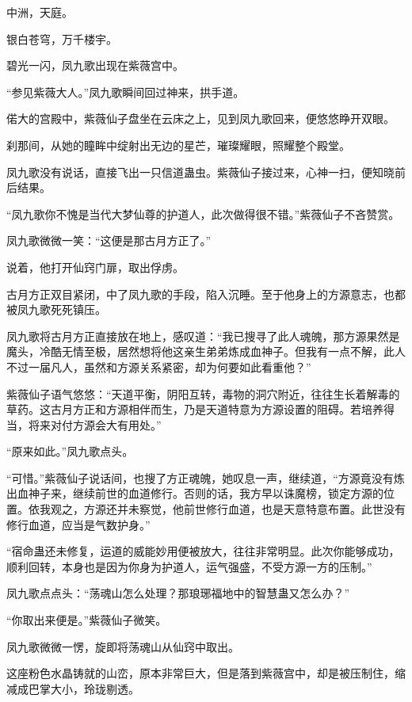 
\begin{this_body}



中洲，天庭。

银白苍穹，万千楼宇。

碧光一闪，凤九歌出现在紫薇宫中。

“参见紫薇大人。”凤九歌瞬间回过神来，拱手道。

偌大的宫殿中，紫薇仙子盘坐在云床之上，见到凤九歌回来，便悠悠睁开双眼。

刹那间，从她的瞳眸中绽射出无边的星芒，璀璨耀眼，照耀整个殿堂。

凤九歌没有说话，直接飞出一只信道蛊虫。紫薇仙子接过来，心神一扫，便知晓前后结果。

“凤九歌你不愧是当代大梦仙尊的护道人，此次做得很不错。”紫薇仙子不吝赞赏。

凤九歌微微一笑：“这便是那古月方正了。”

说着，他打开仙窍门扉，取出俘虏。

古月方正双目紧闭，中了凤九歌的手段，陷入沉睡。至于他身上的方源意志，也都被凤九歌死死镇压。

凤九歌将古月方正直接放在地上，感叹道：“我已搜寻了此人魂魄，那方源果然是魔头，冷酷无情至极，居然想将他这亲生弟弟炼成血神子。但我有一点不解，此人不过一届凡人，虽然和方源关系紧密，却为何要如此看重他？”

紫薇仙子语气悠悠：“天道平衡，阴阳互转，毒物的洞穴附近，往往生长着解毒的草药。这古月方正和方源相伴而生，乃是天道特意为方源设置的阻碍。若培养得当，将来对付方源会大有用处。”

“原来如此。”凤九歌点头。

“可惜。”紫薇仙子说话间，也搜了方正魂魄，她叹息一声，继续道，“方源竟没有炼出血神子来，继续前世的血道修行。否则的话，我方早以诛魔榜，锁定方源的位置。依我观之，方源还并未察觉，他前世修行血道，也是天意特意布置。此世没有修行血道，应当是气数护身。”

“宿命蛊还未修复，运道的威能妙用便被放大，往往非常明显。此次你能够成功，顺利回转，本身也是因为你身为护道人，运气强盛，不受方源一方的压制。”

凤九歌点点头：“荡魂山怎么处理？那琅琊福地中的智慧蛊又怎么办？”

“你取出来便是。”紫薇仙子微笑。

凤九歌微微一愣，旋即将荡魂山从仙窍中取出。

这座粉色水晶铸就的山峦，原本非常巨大，但是落到紫薇宫中，却是被压制住，缩减成巴掌大小，玲珑剔透。


\end{this_body}
